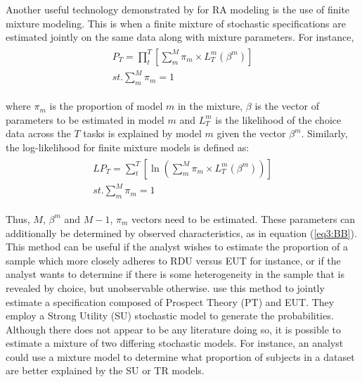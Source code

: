 \documentclass[../main.tex]{subfiles}
\begin{document}
Another useful technology demonstrated by \textcite{Harrison2008a} for RA modeling is the use of finite mixture modeling.
This is when a finite mixture of stochastic specifications are estimated jointly on the same data along with mixture parameters.
For instance,
\begin{align}
	\label{eq3:PT_Mix}
	\begin{split}
		\bm{\mathit{P_T}} = \prod_t^T \left[ \sum_m^M \pi_m \times L_T^m(\beta^m) \right]\\ 
		\mathit{st.} \sum_m^M \pi_m = 1
	\end{split}
\end{align}

\noindent where $\pi_m$ is the proportion of model $m$ in the mixture, $\beta$ is the vector of parameters to be estimated in model $m$ and $L_T^m$ is the likelihood of the choice data across the $T$ tasks is explained by model $m$ given the vector $\beta^m$.
Similarly, the log-likelihood for finite mixture models is defined as:
\begin{align}
	\label{eq3:LPT_Mix}
	\begin{split}
		\bm{\mathit{LP_T}} = \sum_t^T \left[ \ln \left( \sum_m^M \pi_m \times L_T^m(\beta^m) \right) \right]\\ 
		\mathit{st.} \sum_m^M \pi_m = 1
	\end{split}
\end{align}

\noindent Thus, $M$, $\beta^m$ and $M-1$, $\pi_m$ vectors need to be estimated.
These parameters can additionally be determined by observed characteristics, as in equation (\ref{eq3:BB}).
This method can be useful if the analyst wishes to estimate the proportion of a sample which more closely adheres to RDU versus EUT for instance, or if the analyst wants to determine if there is some heterogeneity in the sample that is revealed by choice, but unobservable otherwise.
\textcite[141]{Harrison2008a} use this method to jointly estimate a specification composed of Prospect Theory (PT) and EUT.
They employ a Strong Utility (SU) stochastic model to generate the probabilities.
Although there does not appear to be any literature doing so, it is possible to estimate a mixture of two differing stochastic models.
For instance, an analyst could use a mixture model to determine what proportion of subjects in a dataset are better explained by the SU or TR models.{\footnotemark}

\addtocounter{footnote}{-1}
 
\end{document}
